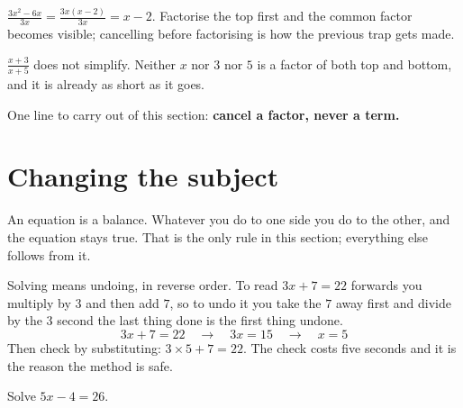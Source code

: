 \begin{fr}
\begin{ansblock}
$\frac{3x^{2} - 6x}{3x} = \frac{3x(x - 2)}{3x} = x - 2$. Factorise the top
first and the common factor becomes visible; cancelling before factorising is
how the previous trap gets made.

$\frac{x + 3}{x + 5}$ does not simplify. Neither $x$ nor $3$ nor $5$ is a
factor of both top and bottom, and it is already as short as it goes.
\end{ansblock}

One line to carry out of this section: \textbf{cancel a factor, never a term.}
\end{fr}

\section{Changing the subject}
\label{sec:F02-rearranging}

\begin{fr}
An equation is a balance. Whatever you do to one side you do to the other, and
the equation stays true. That is the only rule in this section; everything else
follows from it.

Solving means undoing, in reverse order. To read $3x + 7 = 22$ forwards you
multiply by $3$ and then add $7$, so to undo it you take the $7$ away first and
divide by the $3$ second \dash{} the last thing done is the first thing undone.
\[ 3x + 7 = 22 \quad\longrightarrow\quad 3x = 15
   \quad\longrightarrow\quad x = 5 \]
Then check by substituting: $3 \times 5 + 7 = 22$. The check costs five seconds
and it is the reason the method is safe.

Solve $5x - 4 = 26$.
\nextframe
\end{fr}

